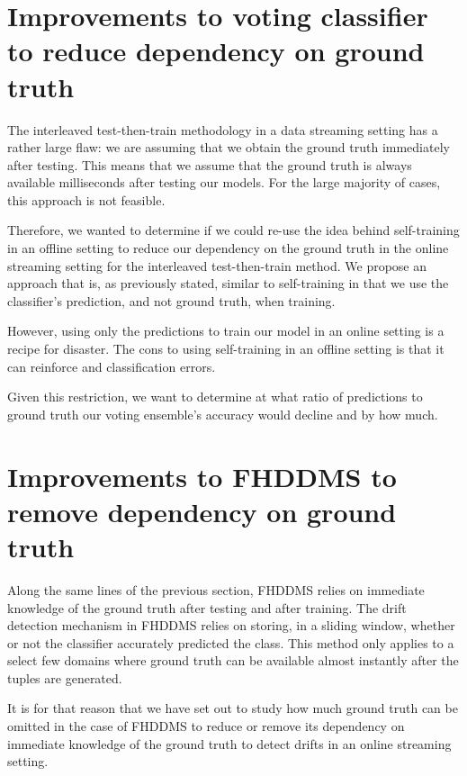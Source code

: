 
\section{Improvements to voting classifier to reduce dependency on ground truth}

The interleaved test-then-train methodology in a data streaming setting has a rather large flaw: we are assuming that we obtain the ground truth immediately after testing. This means that we assume that the ground truth is always available milliseconds after testing our models. For the large majority of cases, this approach is not feasible.

Therefore, we wanted to determine if we could re-use the idea behind self-training in an offline setting to reduce our dependency on the ground truth in the online streaming setting for the interleaved test-then-train method. We propose an approach that is, as previously stated, similar to self-training in that we use the classifier's prediction, and not ground truth, when training.

However, using only the predictions to train our model in an online setting is a recipe for disaster. The cons to using self-training in an offline setting is that it can reinforce and classification errors.

Given this restriction, we want to determine at what ratio of predictions to ground truth our voting ensemble's accuracy would decline and by how much.


\section{Improvements to FHDDMS to remove dependency on ground truth}

Along the same lines of the previous section, FHDDMS relies on immediate knowledge of the ground truth after testing and after training. The drift detection mechanism in FHDDMS relies on storing, in a sliding window, whether or not the classifier accurately predicted the class. This method only applies to a select few domains where ground truth can be available almost instantly after the tuples are generated.

It is for that reason that we have set out to study how much ground truth can be omitted in the case of FHDDMS to reduce or remove its dependency on immediate knowledge of the ground truth to detect drifts in an online streaming setting.

